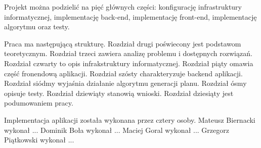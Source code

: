 Projekt można podzielić na pięć głównych części: konfigurację infrastruktury informatycznej, implementację back-end, implementację front-end, implementację algorytmu oraz testy.

Praca ma następującą strukturę. Rozdział drugi poświecony jest podstawom teoretycznym. Rozdział trzeci zawiera analizę problemu i dostępnych rozwiązań. Rozdział czwarty to opis infrakstruktury informatycznej. Rozdział piąty omawia część fronendową aplikacji. Rozdział szósty charakteryzuje backend aplikacji. Rozdział siódmy wyjaśnia działanie algorytmu generacji planu. Rozdział ósmy opisuje testy. Rozdział dziewiąty stanowią wnioski. Rozdział dziesiąty jest podumowaniem pracy. 

Implementacja aplikacji została wykonana przez cztery osoby.
Mateusz Biernacki wykonał ...
Dominik Boła wykonał ...
Maciej Goral wykonał ...
Grzegorz Piątkowski wykonał ...

